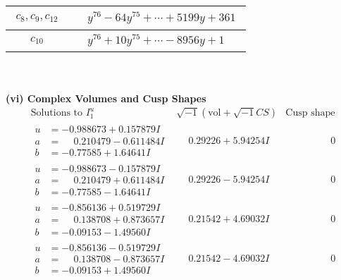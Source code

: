 \documentclass[1p]{elsarticle_modified}
\theoremstyle{definition}
\newcommand{\I}{\sqrt{-1}}
\begin{document}
\begin{tabular}{m{50pt}|m{274pt}}
\hline $$\begin{aligned}c_{8},c_{9},c_{12}\end{aligned}$$&$\begin{aligned}
&y^{76}-64 y^{75}+\cdots+5199 y+361
\end{aligned}$\\
\hline $$\begin{aligned}c_{10}\end{aligned}$$&$\begin{aligned}
&y^{76}+10 y^{75}+\cdots-8956 y+1
\end{aligned}$\\
\hline
\end{tabular}\\~\\
\newpage\flushleft \textbf{(vi) Complex Volumes and Cusp Shapes}
$$\begin{array}{c|c|c}  
\text{Solutions to }I^u_{1}& \I (\text{vol} + \sqrt{-1}CS) & \text{Cusp shape}\\
 \hline 
\begin{aligned}
u &= -0.988673 + 0.157879 I \\
a &= \phantom{-}0.210479 - 0.611484 I \\
b &= -0.77585 + 1.64641 I\end{aligned}
 & \phantom{-}0.29226 + 5.94254 I & \phantom{-0.000000 } 0 \\ \hline\begin{aligned}
u &= -0.988673 - 0.157879 I \\
a &= \phantom{-}0.210479 + 0.611484 I \\
b &= -0.77585 - 1.64641 I\end{aligned}
 & \phantom{-}0.29226 - 5.94254 I & \phantom{-0.000000 } 0 \\ \hline\begin{aligned}
u &= -0.856136 + 0.519729 I \\
a &= \phantom{-}0.138708 + 0.873657 I \\
b &= -0.09153 - 1.49560 I\end{aligned}
 & \phantom{-}0.21542 + 4.69032 I & \phantom{-0.000000 } 0 \\ \hline\begin{aligned}
u &= -0.856136 - 0.519729 I \\
a &= \phantom{-}0.138708 - 0.873657 I \\
b &= -0.09153 + 1.49560 I\end{aligned}
 & \phantom{-}0.21542 - 4.69032 I & \phantom{-0.000000 } 0 \\ \hline\begin{aligned}

\end{aligned}
\end{array}$$
\end{document}
